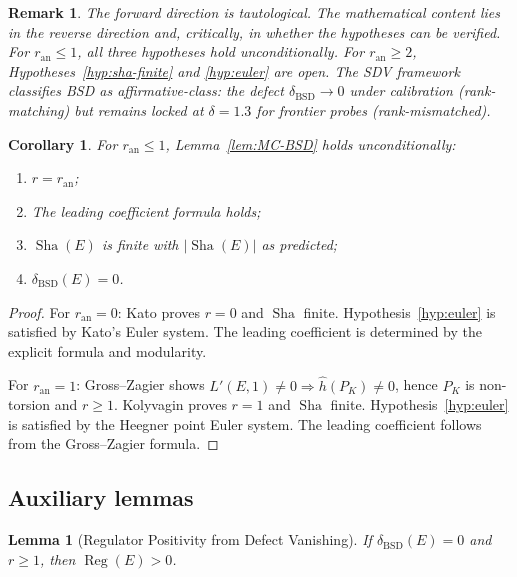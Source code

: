 \documentclass[11pt]{article}
\newtheorem{lemma}[theorem]{Lemma}
\newtheorem{corollary}[theorem]{Corollary}
\newtheorem{remark}[theorem]{Remark}
\DeclareMathOperator{\Reg}{Reg}
\DeclareMathOperator{\Sha}{Sha}
\begin{document}
\begin{remark}
The forward direction is tautological.  The mathematical content lies in the
reverse direction and, critically, in whether the hypotheses can be verified.
For $r_{\mathrm{an}} \leq 1$, all three hypotheses hold unconditionally.  For
$r_{\mathrm{an}} \geq 2$, Hypotheses~\ref{hyp:sha-finite} and \ref{hyp:euler}
are open.  The SDV framework classifies BSD as affirmative-class: the defect
$\delta_{\mathrm{BSD}} \to 0$ under calibration (rank-matching) but remains
locked at $\delta = 1.3$ for frontier probes (rank-mismatched).
\end{remark}

\begin{corollary}
\label{cor:low-rank}
For $r_{\mathrm{an}} \leq 1$, Lemma~\ref{lem:MC-BSD} holds unconditionally:
\begin{enumerate}
  \item $r = r_{\mathrm{an}}$;
  \item The leading coefficient formula holds;
  \item $\Sha(E)$ is finite with $|\Sha(E)|$ as predicted;
  \item $\delta_{\mathrm{BSD}}(E) = 0$.
\end{enumerate}
\end{corollary}

\begin{proof}
For $r_{\mathrm{an}} = 0$: Kato \cite{Kato} proves $r = 0$ and $\Sha$ finite.
Hypothesis~\ref{hyp:euler} is satisfied by Kato's Euler system.  The leading
coefficient is determined by the explicit formula and modularity.

For $r_{\mathrm{an}} = 1$: Gross--Zagier \cite{GZ} shows $L'(E,1) \neq 0
\Rightarrow \hat{h}(P_K) \neq 0$, hence $P_K$ is non-torsion and $r \geq 1$.
Kolyvagin \cite{Koly} proves $r = 1$ and $\Sha$ finite.
Hypothesis~\ref{hyp:euler} is satisfied by the Heegner point Euler system.
The leading coefficient follows from the Gross--Zagier formula.
\end{proof}

\subsection{Auxiliary lemmas}

\begin{lemma}[Regulator Positivity from Defect Vanishing]
\label{lem:reg-positive}
If $\delta_{\mathrm{BSD}}(E) = 0$ and $r \geq 1$, then $\Reg(E) > 0$.
\end{lemma}
\end{document}
